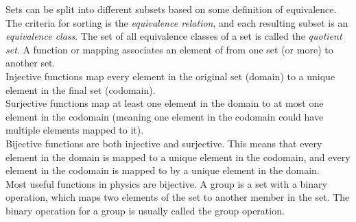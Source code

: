 	Sets can be split into different subsets based on some definition of equivalence. The criteria for sorting is the \emph{equivalence relation}, and each resulting subset is an \emph{equivalence class}. The set of all equivalence classes of a set is called the \emph{quotient set}.
	\newpage
	A function or mapping associates an element of from one set (or more) to another set.  
	\\
	Injective functions map every element in the original set (domain) to a unique element in the final set (codomain).
	\\
	Surjective functions map at least one element in the domain to at most one element in the codomain (meaning one element in the codomain could have multiple elements mapped to it). 
	\\
	Bijective functions are both injective and surjective. This means that every element in the domain is mapped to a unique element in the codomain, and every element in the codomain is mapped to by a unique element in the domain.
	\\
	Most useful functions in physics are bijective.
	\newpage
	A group is a set with a binary operation, which maps two elements of the set to another member in the set. The binary operation for a group is usually called the group operation. 
	\newpage
